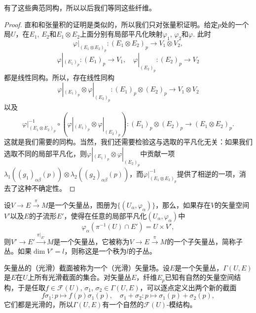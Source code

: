 有了这些典范同构，所以以后我们等同这些纤维。

\begin{proof}
直和和张量积的证明是类似的，所以我们只对张量积证明。给定$p$处的一个局$U$，在$E_1$, $E_2$和$E_1\otimes E_2$上面分别有局部平凡化映射$\varphi_1$, $\varphi_2$和$\varphi$. 此时
\[
	\varphi|_{(E_1\otimes E_2)_p}:(E_1\otimes E_2)_p\to V_1\otimes V_2,
\]
\[
	\varphi|_{(E_1)_p}:(E_1)_p\to V_1,\quad \varphi|_{(E_2)_p}:(E_2)_p\to V_2
\]
都是线性同构。所以，存在线性同构
\[
	\varphi|_{(E_1)_p}\otimes \varphi|_{(E_2)_p}:(E_1)_p\otimes (E_2)_p\to V_1\otimes V_2
\]
以及
\[
	\varphi|_{(E_1\otimes E_2)_p}^{-1}\circ \left(\varphi|_{(E_1)_p}\otimes \varphi|_{(E_2)_p}\right):(E_1)_p\otimes (E_2)_p\to (E_1\otimes E_2)_p.
\]
这就是我们需要的同构。当然，我们还需要检验这与选取的平凡化无关：如果我们选取不同的局部平凡化，则$\varphi|_{(E_1)_p}\otimes \varphi|_{(E_2)_p}$中贡献一项$\lambda_1((g_1)_{\alpha\beta}(p))\otimes \lambda_2((g_2)_{\alpha\beta}(p))$，而$\varphi|_{(E_1\otimes E_2)_p}^{-1}$提供了相逆的一项，消去了这种不确定性。
\end{proof}



\begin{para}[矢量丛的子丛]
设$V\to E\xrightarrow{\pi} M$是一个矢量丛，图册为$\{(U_\alpha,\varphi_\alpha)\}$，那么，如果存在$V$的矢量空间$V'$以及$E$的子流形$E'$，使得在任意的局部平凡化$(U_\alpha,\varphi_\alpha)$中
\[
	\varphi_\alpha(\pi^{-1}(U)\cap E')=U\times V',
\]
则$V'\to E'\xrightarrow{\pi|_{E'}}M$是一个矢量丛，它被称为$V\to E\xrightarrow{\pi} M$的一个子矢量丛，简称子丛。如果$\dim V'=l$，则称这是一个秩为$l$的子丛。
\end{para}

\begin{para}[矢量丛的截面]
矢量丛的（光滑）截面被称为一个（光滑）矢量场。设$E$是一个矢量丛，$\Gamma(U,E)$是$E$在$U$上所有光滑截面的集合。对矢量丛$E$，纤维$E_p$已知有自然的矢量空间结构，于是任取$f\in \mathcal{F}(U)$, $\sigma_1$, $\sigma_2\in \Gamma(U,E)$，可以逐点定义出两个新的截面
\[
	f\sigma_1:p\mapsto f(p)\sigma_1(p),\quad \sigma_1+\sigma_2:p\mapsto \sigma_1(p)+\sigma_2(p),
\]
它们都是光滑的，所以$\Gamma(U,E)$有一个自然的$\mathcal{F}(U)$-模结构。
\end{para}

